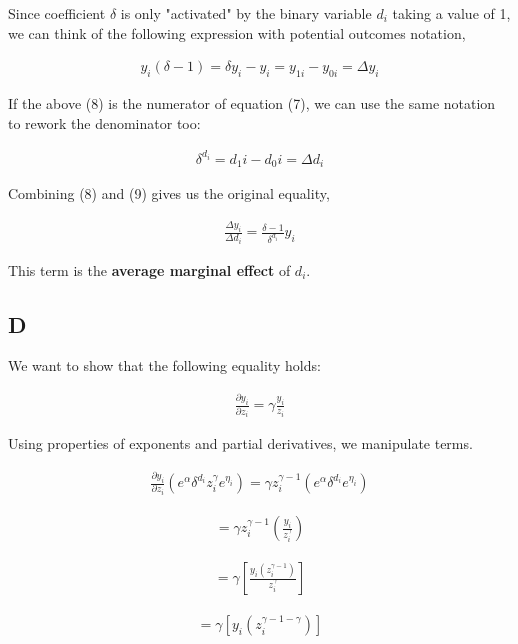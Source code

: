 \documentclass{article}
\begin{document}
Since coefficient $\delta$ is only "activated" by the binary variable $d_i$ taking a value of 1, we can think of the following expression with potential outcomes notation,

\begin{align}
    y_i (\delta - 1) = \delta y_i - y_i = y_{1i} - y_{0i} = \Delta y_i
\end{align}

If the above (8) is the numerator of equation (7), we can use the same notation to rework the denominator too:

\begin{align}
    \delta^{d_i} = d_1i - d_0i = \Delta d_i
\end{align}

Combining (8) and (9) gives us the original equality,

\begin{align}
    \frac{\Delta y_i}{\Delta {d_i}}  = \frac{\delta - 1}{\delta ^ {d_i}} y_i
\end{align}

This term is the \textbf{average marginal effect} of $d_i$.

\subsection{D}

We want to show that the following equality holds:

\begin{align}
    \frac{\partial y_i}{\partial z_i} = \gamma \frac{y_i}{z_i}
\end{align}

Using properties of exponents and partial derivatives, we manipulate terms.

\begin{align}
    \frac{\partial y_i}{\partial z_i} \left(e^\alpha \delta^{d_i} z^\gamma_i e^{\eta_i}\right) = \gamma z_i ^ {\gamma - 1} \left(e^\alpha \delta^{d_i}e^{\eta_i}\right)
\end{align}

\begin{align}
    = \gamma z_i ^{\gamma - 1} \left(\frac{y_i}{z_i^\gamma} \right)
\end{align}

\begin{align}
    = \gamma \left[\frac{y_i (z_i ^{\gamma - 1})}{z_i^\gamma} \right]
\end{align}

\begin{align}
    = \gamma \left[y_i \left(z_i ^ {\gamma - 1 - \gamma} \right) \right]
\end{align}
\end{document}
